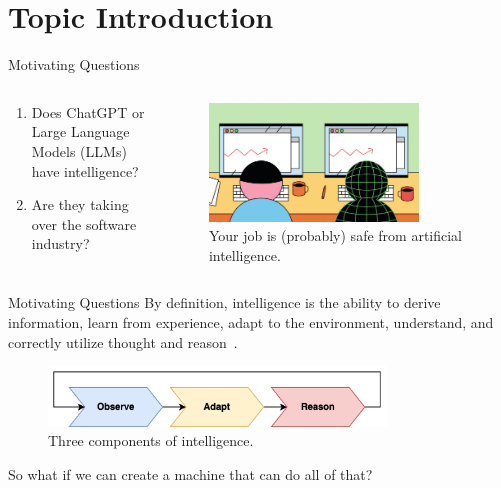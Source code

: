 \section{Topic Introduction}

\begin{frame}{Motivating Questions}
    \begin{columns}[T]
        \begin{column}{0.5\textwidth}
            \begin{enumerate}
                \item Does ChatGPT or Large Language Models (LLMs) have intelligence?
                \item Are they taking over the software industry?
            \end{enumerate}
        \end{column}
        \begin{column}{0.5\textwidth}
            \begin{figure}[!htb]
                \centering
                \includegraphics[width=0.8\textwidth]{img/ai_taking_jobs}
                \captionsetup{font=small,labelformat=empty}
                \caption{Your job is (probably) safe from artificial intelligence.\footnotemark[1]}
            \end{figure}
        \end{column}
    \end{columns}
\end{frame}

\begin{frame}{Motivating Questions}
    By definition, intelligence is the ability to derive information, learn from experience, adapt to the environment, understand, and correctly utilize thought and reason~\cite{chollet2019measure}.\\
    \vspace{0.5cm}
    \begin{figure}[!htb]
        \centering
        \includegraphics[width=0.8\textwidth]{img/intelligence}
        \captionsetup{font=small,labelformat=empty}
        \caption{Three components of intelligence.}
    \end{figure}
    So what if we can create a machine that can do all of that?
\end{frame}

